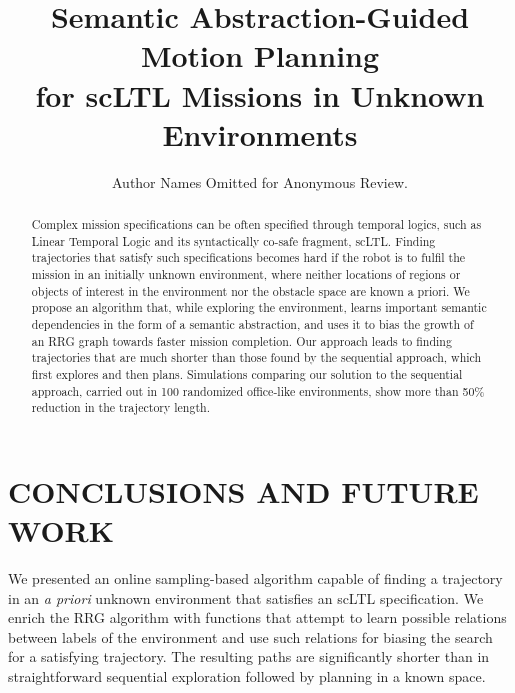 \documentclass[conference]{IEEEtran}
\title{
Semantic Abstraction-Guided Motion Planning \\ for scLTL Missions in Unknown Environments
}
\author{Author Names Omitted for Anonymous Review.}
\begin{document}


\maketitle



\begin{abstract}
Complex mission specifications can be often specified through temporal logics, such as Linear Temporal Logic and its syntactically co-safe fragment, scLTL. Finding trajectories that satisfy such specifications becomes hard if the robot is to fulfil the mission in an initially unknown environment, where neither locations of  regions or objects of interest in the environment nor the obstacle space are known a priori. We propose an algorithm that, while exploring the environment, learns important semantic dependencies in the form of a semantic abstraction, and uses it to bias the growth of an RRG graph towards faster mission completion. Our approach leads to finding trajectories that are much shorter than those found by the sequential approach, which first explores and then plans. Simulations comparing our solution to the sequential approach, carried out in 100 randomized office-like environments, show more than 50\% reduction in the trajectory length.
\end{abstract}

\IEEEpeerreviewmaketitle















\section{CONCLUSIONS AND FUTURE WORK}\label{sec:conclusion}
We presented an online sampling-based algorithm capable of finding a trajectory in an \emph{a priori} unknown environment that satisfies an scLTL specification. We enrich the RRG algorithm with functions that attempt to learn possible relations between labels of the environment and use such relations for biasing the search for a satisfying trajectory. The resulting paths are significantly shorter than in straightforward sequential exploration followed by planning in a known space.
\end{document}
